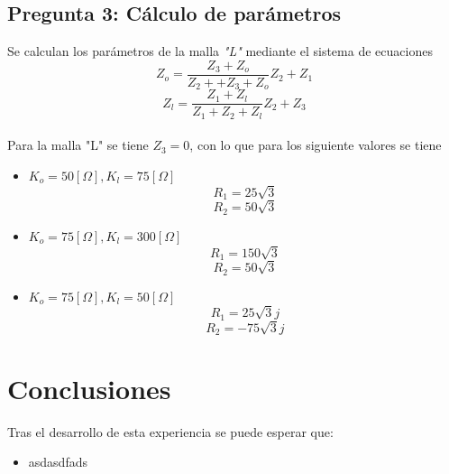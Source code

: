 \documentclass[11pt,onecolumn]{article}
\begin{document}

\subsection*{Pregunta 3: Cálculo de parámetros}

Se calculan los parámetros de la malla \textit{"L"} mediante el sistema de ecuaciones
\\
	$$Z_o = \frac{Z_3+Z_o}{Z_2++Z_3+Z_o}Z_2 + Z_1$$
	$$Z_l = \frac{Z_1+Z_l}{Z_1+Z_2+Z_l}Z_2 + Z_3$$
\\
Para la malla "L" se tiene $Z_3 = 0$, con lo que para los siguiente valores se tiene\\

	\begin{itemize}
	\item $K_o = 50[\Omega], K_l = 75[\Omega]$
			$$ R_1 = 25\sqrt{3} $$
			$$ R_2 = 50\sqrt{3} $$
	\item $K_o = 75[\Omega], K_l = 300[\Omega]$
			$$ R_1 = 150\sqrt{3} $$
			$$ R_2 = 50\sqrt{3} $$
	\item $K_o = 75[\Omega], K_l = 50[\Omega]$
			$$ R_1 = 25\sqrt{3}j $$
			$$ R_2 = -75\sqrt{3}j $$
	\end{itemize}




\newpage
\section{Conclusiones}

Tras el desarrollo de esta experiencia se puede esperar que:
\begin{itemize}
\item asdasdfads

\end{itemize}
\end{document}
